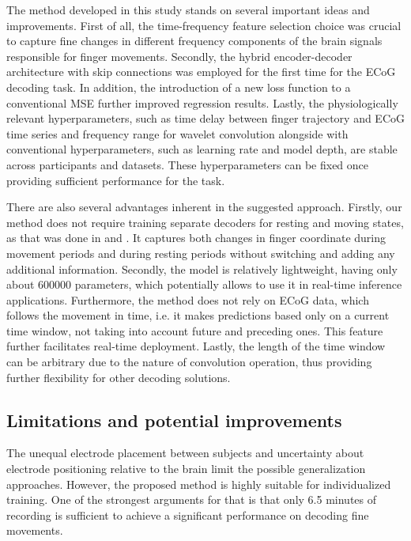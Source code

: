 \documentclass[letterpaper]{article} \usepackage{aaai22}  \usepackage{times}  \usepackage{helvet}  \usepackage{courier}  \usepackage[hyphens]{url}  \usepackage{graphicx} \urlstyle{rm} \def\UrlFont{\rm}  \usepackage{natbib}  \usepackage{caption} \DeclareCaptionStyle{ruled}{labelfont=normalfont,labelsep=colon,strut=off} \frenchspacing  \setlength{\pdfpagewidth}{8.5in}  \setlength{\pdfpageheight}{11in}  \usepackage{algorithm}
\begin{document}
The method developed in this study stands on several important ideas and improvements. First of all, the time-frequency feature selection choice was crucial to capture fine changes in different frequency components of the brain signals responsible for finger movements. Secondly, the hybrid encoder-decoder architecture with skip connections was employed for the first time for the ECoG decoding task. In addition, the introduction of a new loss function to a conventional MSE further improved regression results. Lastly, the physiologically relevant hyperparameters, such as time delay between finger trajectory and ECoG time series and frequency range for wavelet convolution alongside with conventional hyperparameters, such as learning rate and model depth, are stable across participants and datasets. These hyperparameters can be fixed once providing sufficient performance for the task.  

There are also several advantages inherent in the suggested approach. Firstly, our method does not require training separate decoders for resting and moving states, as that was done in \citet{elgharabawy2016} and \citet{flamary2012}. It captures both changes in finger coordinate during movement periods and during resting periods without switching and adding any additional information. Secondly, the model is relatively lightweight, having only about $600 000$ parameters, which potentially allows to use it in real-time inference applications. Furthermore, the method does not rely on ECoG data, which follows the movement in time, i.e. it makes predictions based only on a current time window, not taking into account future and preceding ones. This feature further facilitates real-time deployment. Lastly, the length of the time window can be arbitrary due to the nature of convolution operation, thus providing further flexibility for other decoding solutions. 

\subsection{Limitations and potential improvements}

The unequal electrode placement between subjects and uncertainty about electrode positioning relative to the brain limit the possible generalization approaches. However, the proposed method is highly suitable for individualized training. One of the strongest arguments for that is that only 6.5 minutes of recording is sufficient to achieve a significant performance on decoding fine movements. 
\end{document}
